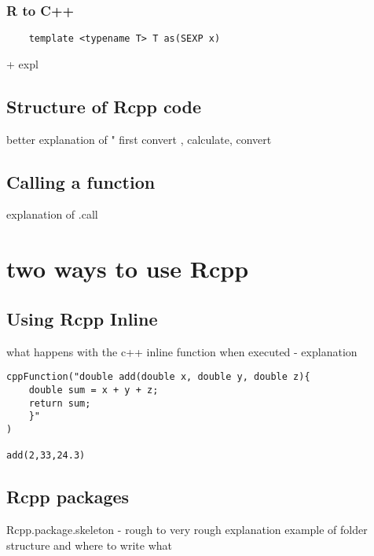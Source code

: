 \documentclass{article}
\begin{document}
        \subsubsection{R to C++}
        \begin{verbatim}
    template <typename T> T as(SEXP x)
        \end{verbatim} 
        + expl
    \subsection{Structure of Rcpp code}
        better explanation of " first convert , calculate, convert
    \subsection{Calling a function}
        explanation of .call
\section{ two ways to use Rcpp}

    \subsection{Using Rcpp Inline}

    what happens with the c++ inline function when executed - explanation
\begin{verbatim}
cppFunction("double add(double x, double y, double z){
    double sum = x + y + z;
    return sum;
    }"
)

add(2,33,24.3)       
\end{verbatim}


    \subsection{Rcpp packages}
        Rcpp.package.skeleton - rough to very rough explanation
        \newline
        example of folder structure and where to write what
\end{document}
